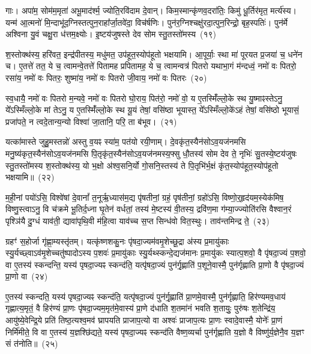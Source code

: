 गाः। अपा॑म॒ सोम॑म॒मृता॑ अभू॒माद॑र्श्म॒ ज्योति॒रवि॑दाम दे॒वान्। किम॒स्मान्कृ॑णव॒दरा॑तिः॒ किमु॑ धू॒र्तिर॑मृत॒ मर्त्य॑स्य। यन्म॑ आ॒त्मनो॑ मि॒न्दाभू॑द॒ग्निस्तत्पुन॒राहा᳚र्जा॒तवे॑दा॒ विच॑र्\mbox{}षणिः। पुन॑र॒ग्निश्चक्षु॑रदा॒त्पुन॒रिन्द्रो॒ बृह॒स्पतिः॑। पुन॑र्मे अश्विना यु॒वं चक्षु॒रा ध॑त्तम॒क्ष्योः। इ॒ष्टय॑जुषस्ते देव सोम स्तु॒तस्तो॑मस्य~(१९)

श॒स्तोक्थ॑स्य॒ हरि॑वत॒ इन्द्र॑पीतस्य॒ मधु॑मत॒ उप॑हूत॒स्योप॑हूतो भक्षयामि। आ॒पूर्याः॒ स्था मा॑ पूरयत प्र॒जया॑ च॒ धने॑न च। ए॒तत्ते॑ तत॒ ये च॒ त्वामन्वे॒तत्ते॑ पितामह प्रपितामह॒ ये च॒ त्वामन्वत्र॑ पितरो यथाभा॒गं म॑न्दध्वं॒ नमो॑ वः पितरो॒ रसा॑य॒ नमो॑ वः पितरः॒ शुष्मा॑य॒ नमो॑ वः पितरो जी॒वाय॒ नमो॑ वः पितरः~(२०)

स्व॒धायै॒ नमो॑ वः पितरो म॒न्यवे॒ नमो॑ वः पितरो घो॒राय॒ पित॑रो॒ नमो॑ वो॒ य ए॒तस्मिँ॑ल्लो॒के स्थ यु॒ष्माꣴस्ते\-ऽनु॒ ये᳚\-ऽस्मिँल्लो॒के मां ते\-ऽनु॒ य ए॒तस्मिँ॑ल्लो॒के स्थ यू॒यं तेषां॒ वसि॑ष्ठा भूयास्त॒ ये᳚\-ऽस्मिँल्लो॒के॑\-ऽहं तेषां॒ वसि॑ष्ठो भूयासं॒ प्रजा॑पते॒ न त्वदे॒तान्य॒न्यो विश्वा॑ जा॒तानि॒ परि॒ ता ब॑भूव।~(२१)

यत्का॑मास्ते जुहु॒मस्तन्नो॑ अस्तु व॒यꣴ स्या॑म॒ पत॑यो रयी॒णाम्। दे॒वकृ॑त॒स्यैन॑सो\-ऽव॒यज॑नमसि मनु॒ष्य॑कृत॒स्यैन॑सो\-ऽ\-व॒यज॑नमसि पि॒तृकृ॑त॒स्यैन॑सो\-ऽव॒यज॑नमस्य॒फ्सु धौ॒तस्य॑ सोम देव ते॒ नृभिः॑ सु॒तस्ये॒ष्टय॑जुषः स्तु॒तस्तो॑मस्य श॒स्तोक्थ॑स्य॒ यो भ॒क्षो अ॑श्व॒सनि॒र्यो गो॒सनि॒स्तस्य॑ ते पि॒तृभि॑र्भ॒क्षं कृ॑त॒स्योप॑हूत॒स्योप॑हूतो भक्षयामि॥~(२२)

{}%

म॒ही॒नां पयो॑\-ऽसि॒ विश्वे॑षां दे॒वानां᳚ त॒नूर्\mbox{}ऋ॒ध्यास॑म॒द्य पृ॑षतीनां॒ ग्रहं॒ पृष॑तीनां॒ ग्रहो॑\-ऽसि॒ विष्णो॒र्॒\mbox{}हृद॑यम॒स्येक॑मिष॒ विष्णु॒स्त्वाऽनु॒ वि च॑क्रमे भू॒तिर्द॒ध्ना घृ॒तेन॑ वर्धतां॒ तस्य॑ मे॒ष्टस्य॑ वी॒तस्य॒ द्रवि॑ण॒मा ग॑म्या॒ज्ज्योति॑रसि वैश्वान॒रं पृश्ञि॑यै दु॒ग्धं याव॑ती॒ द्यावा॑पृथि॒वी म॑हि॒त्वा याव॑च्च स॒प्त सिन्ध॑वो वित॒स्थुः। ताव॑न्तमिन्द्र ते॒~(२३)

ग्रहꣳ॑ स॒होर्जा गृ॑ह्णा॒म्यस्तृ॑तम्। यत्कृ॑ष्णशकु॒नः पृ॑षदा॒ज्यम॑व\-मृ॒शेच्छू॒द्रा अ॑स्य प्र॒मायु॑काः स्यु॒र्यच्छ्वा\-ऽव॑मृ॒शेच्चतु॑ष्पादो\-ऽस्य प॒शवः॑ प्र॒मायु॑काः स्यु॒र्यथ्स्कन्दे॒द्यज॑मानः प्र॒मायु॑कः स्यात्प॒शवो॒ वै पृ॑षदा॒ज्यं प॒शवो॒ वा ए॒तस्य॑ स्कन्दन्ति॒ यस्य॑ पृषदा॒ज्यꣴ स्कन्द॑ति॒ यत्पृ॑षदा॒ज्यं पुन॑र्गृ॒ह्णाति॑ प॒शूने॒वास्मै॒ पुन॑र्गृह्णाति प्रा॒णो वै पृ॑षदा॒ज्यं प्रा॒णो वा~(२४)

ए॒तस्य॑ स्कन्दति॒ यस्य॑ पृषदा॒ज्यꣴ स्कन्द॑ति॒ यत्पृ॑षदा॒ज्यं पुन॑र्गृ॒ह्णाति॑ प्रा॒णमे॒वास्मै॒ पुन॑र्गृह्णाति॒ हिर॑ण्यमव॒धाय॑ गृह्णात्य॒मृतं॒ वै हिर॑ण्यं प्रा॒णः पृ॑षदा॒ज्यम॒मृत॑मे॒वास्य॑ प्रा॒णे द॑धाति श॒तमा॑नं भवति श॒तायुः॒ पुरु॑षः श॒तेन्द्रि॑य॒ आयु॑ष्ये॒वेन्द्रि॒ये प्रति॑ तिष्ठ॒त्यश्व॒मव॑ घ्रापयति प्राजाप॒त्यो वा अश्वः॑ प्राजाप॒त्यः प्रा॒णः स्वादे॒वास्मै॒ योनेः᳚ प्रा॒णं निर्मि॑मीते॒ वि वा ए॒तस्य॑ य॒ज्ञश्छि॑द्यते॒ यस्य॑ पृषदा॒ज्यꣴ स्कन्द॑ति वैष्ण॒व्यर्चा पुन॑र्गृह्णाति य॒ज्ञो वै विष्णु॑र्य॒ज्ञेनै॒व य॒ज्ञꣳ सं त॑नोति॥~(२५)

